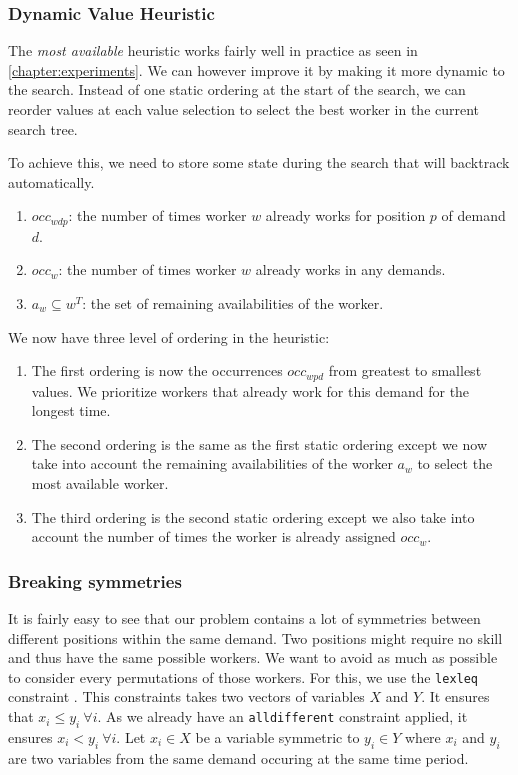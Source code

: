 \documentclass[../../thesis.tex]{subfiles}
\begin{document}
\subsubsection{Dynamic Value Heuristic}

The \emph{most available} heuristic works fairly well in practice as seen in \autoref{chapter:experiments}. 
We can however improve it by making it more dynamic to the search. Instead of one static ordering at the start of the search,
we can reorder values at each value selection to select the best worker in the current search tree.

To achieve this, we need to store some state during the search that will backtrack automatically.

\begin{enumerate}
  \item $occ_{wdp}$: the number of times worker $w$ already works for position $p$ of demand $d$.
  \item $occ_{w}$: the number of times worker $w$ already works in any demands.
  \item $a_{w} \subseteq w^T$: the set of remaining availabilities of the worker.
\end{enumerate}

We now have three level of ordering in the heuristic:

\begin{enumerate}
  \item The first ordering is now the occurrences $occ_{wpd}$ from greatest to smallest values. We prioritize workers that already work for this demand for the longest time.
  \item The second ordering is the same as the first static ordering except we now take into account the 
        remaining availabilities of the worker $a_w$ to select the most available worker.
  \item The third ordering is the second static ordering except we also take into account the number of times the worker 
        is already assigned $occ_w$.
\end{enumerate}

\subsubsection{Breaking symmetries}

It is fairly easy to see that our problem contains a lot of symmetries between different positions within the same demand. 
Two positions might require no skill and thus have the same possible workers. We want to avoid as much as possible to consider every permutations of those workers.
For this, we use the \texttt{lexleq} constraint \cite{Alan:Lex}. This constraints takes two vectors of variables $X$ and $Y$. It ensures that 
$x_i \leq y_i \ \forall i$. As we already have an \texttt{alldifferent} constraint applied, it ensures $x_i < y_i \ \forall i$.
Let $x_i \in X$ be a variable symmetric to $y_i \in Y$ where $x_i$ and $y_i$ are two variables from the same demand occuring at the same time period.
\end{document}

